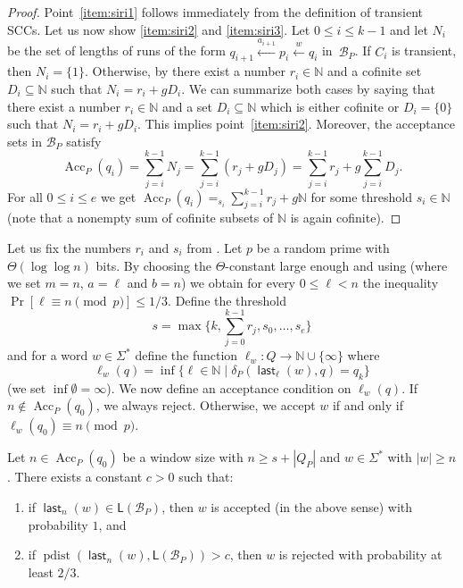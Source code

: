 \documentclass{article}\usepackage[a4paper,margin=20mm]{geometry}
\newcommand{\N}{\mathbb{N}}
\newcommand{\B}{\mathcal{B}}
\renewcommand{\L}{\mathsf{L}}
\DeclareMathOperator{\last}{\mathsf{last}}
\DeclareMathOperator{\pdist}{pdist}
\DeclareMathOperator{\Acc}{Acc}
\renewcommand{\geq}{\geqslant}
\renewcommand{\leq}{\leqslant}
\renewcommand{\ge}{\geq}
\renewcommand{\le}{\leq}
\begin{document}
\begin{proof}
Point~\ref{item:siri1} follows immediately from the definition of transient SCCs.
Let us now show \ref{item:siri2} and \ref{item:siri3}.
Let $0 \le i \le k-1$ and let $N_i$ be the set of lengths of runs of the form $q_{i+1} \xleftarrow{a_{i+1}} p_i \xleftarrow{w} q_i$ in~$\B_P$.
If $C_i$ is transient, then $N_i = \{1\}$.
Otherwise, by  there exist a number $r_i \in \N$ and a cofinite set $D_i \subseteq \N$ such that $N_i = r_i + gD_i$.
We can summarize both cases by saying that there exist a number $r_i \in \N$
and a set $D_i \subseteq \N$
which is either cofinite or $D_i = \{0\}$ such that $N_i = r_i + gD_i$.
This implies point~\ref{item:siri2}.
Moreover, the acceptance sets in $\B_P$ satisfy
\[
	\Acc_P(q_i) = \sum_{j=i}^{k-1} N_j = \sum_{j=i}^{k-1} (r_j + gD_j) = \sum_{j=i}^{k-1} r_j + g \sum_{j=i}^{k-1} D_j.
\]
For all $0 \le i \le e$ we get $\Acc_P(q_i) =_{s_i} \sum_{j=i}^{k-1} r_j + g \N$ for some threshold $s_i \in \N$ (note that a nonempty sum of cofinite subsets of $\N$ is again cofinite).
\end{proof}

Let us fix the numbers $r_i$ and $s_i$ from .
Let $p$ be a random prime with $\Theta(\log \log n)$ bits. By choosing the $\Theta$-constant
large enough and using   (where we set $m = n$, $a = \ell$ and $b = n$) we
obtain for every $0 \le \ell < n$ the inequality
$\Pr[\ell \equiv n \pmod p] \le 1/3$.
Define the threshold 
\[ 
s = \max\{k, \sum_{j=0}^{k-1} r_j, s_0, \dots, s_e \}
\]
and for a word $w \in \Sigma^*$ define the function
$\ell_w \colon Q \to \N \cup \{\infty\}$ where
\[
	\ell_w(q) = \inf \{ \ell \in \N \mid \delta_P(\last_\ell(w),q) = q_k  \}
\]
(we set $\inf \emptyset = \infty$).
We now define an acceptance condition on $\ell_w(q)$.
If $n \notin \Acc_P(q_0)$, we always reject.
Otherwise, we accept $w$ if and only if $\ell_w(q_0) \equiv n \pmod p$.

\begin{lemma}
\label{lm:acceptingconditiononesided}
Let $n \in \Acc_P(q_0)$ be a window size with $n \ge s + |Q_P|$ and $w \in \Sigma^*$ with $|w| \ge n$.
There exists a constant $c > 0$ such that:
\begin{enumerate}[label=(\roman{*}), ref=(\roman{*})]
\item if $\last_n(w) \in \L(\B_P)$, then $w$ is accepted (in the above sense) with probability $1$, and
\item if $\pdist(\last_n(w), \L(\B_P)) > c$, then $w$ is rejected with probability at least $2/3$.
\end{enumerate}
\end{lemma}
\end{document}
